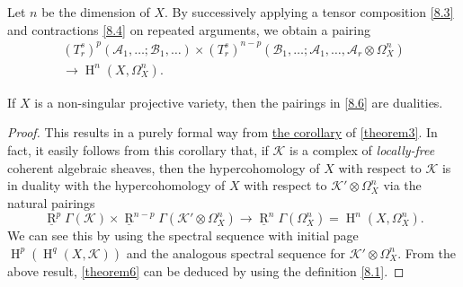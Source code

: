 \documentclass{article}
\theoremstyle{plain}
\newenvironment{theorem}[1]
  {\renewcommand\theinnercustomtheorem{#1}\innercustomtheorem}
  {\endinnercustomtheorem}
\theoremstyle{definition}
\newcommand{\sh}{\mathscr}
\DeclareMathOperator{\RR}{R}
\DeclareMathOperator{\HH}{H}
\begin{document}
Let $n$ be the dimension of $X$.
By successively applying a tensor composition \cref{8.3} and contractions \cref{8.4} on repeated arguments, we obtain a pairing
\[
\label{8.6}
  \begin{gathered}
    (T_r^s)^p(\sh{A}_1,\ldots;\sh{B}_1,\ldots)
    \times (T_r^s)^{n-p}(\sh{B}_1,\ldots;\sh{A}_1,\ldots,\sh{A}_r\otimes\Omega_X^n)
  \\\longrightarrow\HH^n(X,\Omega_X^n).
  \end{gathered}
\tag{8.6}
\]

\begin{theorem}{6}
\label{theorem6}
  If $X$ is a non-singular projective variety, then the pairings in \cref{8.6} are dualities.
\end{theorem}

\begin{proof}
  This results in a purely formal way from \hyperref[theorem3corollary]{the corollary} of \cref{theorem3}.
  In fact, it easily follows from this corollary that, if $\sh{K}$ is a complex of \emph{locally-free} coherent algebraic sheaves, then the hypercohomology of $X$ with respect to $\sh{K}$ is in duality with the hypercohomology of $X$ with respect to $\sh{K}'\otimes\Omega_X^n$ via the natural pairings
  \[
  \label{8.7}
    \underline{\RR}^p\Gamma(\sh{K})
    \times \underline{\RR}^{n-p}\Gamma(\sh{K}'\otimes\Omega_X^n)
    \to \underline{\RR}^n\Gamma(\Omega_X^n)
    = \HH^n(X,\Omega_X^n).
  \tag{8.7}
  \]
  We can see this by using the spectral sequence with initial page $\HH^p(\HH^q(X,\sh{K}))$ and the analogous spectral sequence for $\sh{K}'\otimes\Omega_X^n$.
  From the above result, \cref{theorem6} can be deduced by using the definition \cref{8.1}.
\end{proof}
\end{document}
